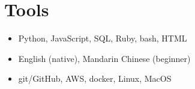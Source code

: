 \documentclass{cultvoucher}
\begin{document}


\section{Tools}
\begin{itemize}
	\item Python, JavaScript, SQL, Ruby, bash, HTML
	\item English (native), Mandarin Chinese (beginner)
\end{itemize}
\begin{itemize}
	\item git/GitHub, AWS, docker, Linux, MacOS
\end{itemize}
\end{document}

